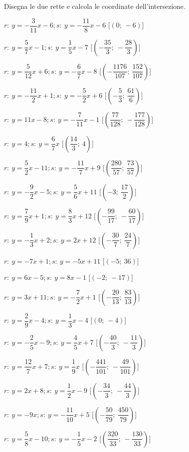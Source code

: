 \begin{esercizio}\label{ese:}
 Disegna le due rette e calcola le coordinate dell'intersezione.
 \begin{enumeratea}
  \item  $r:~y = -\dfrac{3}{11} x -6; s:~y = -\dfrac{11}{8} x -6$ \hfill 
   [$\left(0;~-6\right)$]
  \item  $r:~y = \dfrac{5}{7} x -1; s:~y = \dfrac{1}{5} x -7$ \hfill 
   [$\left(-\dfrac{35}{3};~-\dfrac{28}{3}\right)$]
  \item  $r:~y = \dfrac{5}{12} x +6; s:~y = -\dfrac{6}{7} x -8$ \hfill 
   [$\left(-\dfrac{1176}{107};~\dfrac{152}{107}\right)$]
  \item  $r:~y = -\dfrac{11}{2} x +1; s:~y = -\dfrac{5}{2} x +6$ \hfill 
   [$\left(-\dfrac{5}{3};~\dfrac{61}{6}\right)$]
  \item  $r:~y = 11 x -8; s:~y = -\dfrac{7}{11} x -1$ \hfill 
   [$\left(\dfrac{77}{128};~-\dfrac{177}{128}\right)$]
  \item  $r:~y = 4; s:~y = \dfrac{6}{7} x $ \hfill 
   [$\left(\dfrac{14}{3};~4\right)$]
  \item  $r:~y = \dfrac{5}{2} x -11; s:~y = -\dfrac{11}{7} x +9$ \hfill 
   [$\left(\dfrac{280}{57};~\dfrac{73}{57}\right)$]
  \item  $r:~y = -\dfrac{9}{2} x -5; s:~y = \dfrac{5}{6} x +11$ \hfill 
   [$\left(-3;~\dfrac{17}{2}\right)$]
  \item  $r:~y = \dfrac{7}{9} x +1; s:~y = \dfrac{8}{3} x +12$ \hfill 
   [$\left(-\dfrac{99}{17};~-\dfrac{60}{17}\right)$]
  \item  $r:~y = -\dfrac{1}{3} x +2; s:~y = 2 x +12$ \hfill 
   [$\left(-\dfrac{30}{7};~\dfrac{24}{7}\right)$]
  \item  $r:~y = -7 x +1; s:~y = -5 x +11$ \hfill 
   [$\left(-5;~36\right)$]
  \item  $r:~y = 6 x -5; s:~y = 8 x -1$ \hfill 
   [$\left(-2;~-17\right)$]
  \item  $r:~y = 3 x +11; s:~y = -\dfrac{7}{2} x +1$ \hfill 
   [$\left(-\dfrac{20}{13};~\dfrac{83}{13}\right)$]
  \item  $r:~y = \dfrac{2}{9} x -4; s:~y = \dfrac{1}{3} x -4$ \hfill 
   [$\left(0;~-4\right)$]
  \item  $r:~y = -\dfrac{2}{5} x -9; s:~y = \dfrac{4}{5} x +7$ \hfill 
   [$\left(-\dfrac{40}{3};~-\dfrac{11}{3}\right)$]
  \item  $r:~y = \dfrac{12}{7} x +7; s:~y = \dfrac{1}{9} x $ \hfill 
   [$\left(-\dfrac{441}{101};~-\dfrac{49}{101}\right)$]
  \item  $r:~y = 2 x +8; s:~y = \dfrac{1}{2} x -9$ \hfill 
   [$\left(-\dfrac{34}{3};~-\dfrac{44}{3}\right)$]
  \item  $r:~y = -9 x ; s:~y = -\dfrac{11}{10} x +5$ \hfill 
   [$\left(-\dfrac{50}{79};~\dfrac{450}{79}\right)$]
  \item  $r:~y = \dfrac{5}{8} x -10; s:~y = -\dfrac{1}{5} x -2$ \hfill 
   [$\left(\dfrac{320}{33};~-\dfrac{130}{33}\right)$]
 \end{enumeratea}
\end{esercizio}

